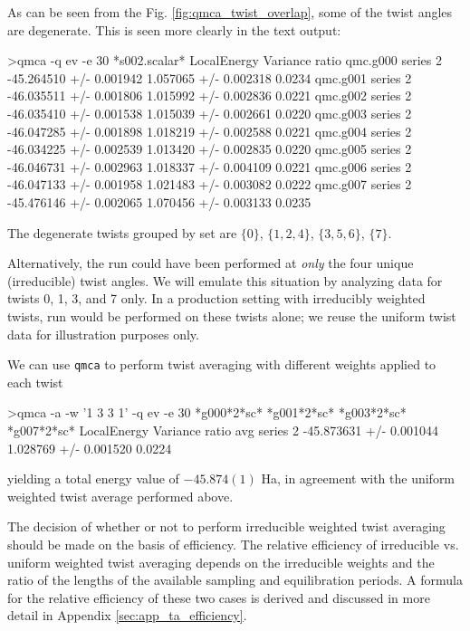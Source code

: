 As can be seen from the Fig. \ref{fig:qmca_twist_overlap}, some of the twist 
angles are degenerate. This is seen more clearly in the text output:
\begin{shade}
>qmca -q ev -e 30 *s002.scalar*
                            LocalEnergy               Variance           ratio 
qmc.g000  series 2  -45.264510 +/- 0.001942   1.057065 +/- 0.002318   0.0234 
qmc.g001  series 2  -46.035511 +/- 0.001806   1.015992 +/- 0.002836   0.0221 
qmc.g002  series 2  -46.035410 +/- 0.001538   1.015039 +/- 0.002661   0.0220 
qmc.g003  series 2  -46.047285 +/- 0.001898   1.018219 +/- 0.002588   0.0221 
qmc.g004  series 2  -46.034225 +/- 0.002539   1.013420 +/- 0.002835   0.0220 
qmc.g005  series 2  -46.046731 +/- 0.002963   1.018337 +/- 0.004109   0.0221 
qmc.g006  series 2  -46.047133 +/- 0.001958   1.021483 +/- 0.003082   0.0222 
qmc.g007  series 2  -45.476146 +/- 0.002065   1.070456 +/- 0.003133   0.0235 
\end{shade}
\noindent
The degenerate twists grouped by set are $\{0\}$, $\{1,2,4\}$, $\{3,5,6\}$, 
$\{7\}$.

Alternatively, the run could have been performed at \emph{only} the four 
unique (irreducible) twist angles.  We will emulate this situation by 
analyzing data for twists 0, 1, 3, and 7 only.  In a production setting 
with irreducibly weighted twists, run would be performed on these twists 
alone; we reuse the uniform twist data for illustration purposes only.  

We can use \texttt{qmca} to perform twist averaging with different 
weights applied to each twist
\begin{shade}
>qmca -a -w '1 3 3 1' -q ev -e 30 *g000*2*sc* *g001*2*sc* *g003*2*sc* *g007*2*sc*
                            LocalEnergy               Variance           ratio 
avg  series 2  -45.873631 +/- 0.001044   1.028769 +/- 0.001520   0.0224 
\end{shade}
\noindent
yielding a total energy value of $-45.874(1)$ Ha, in agreement with the 
uniform weighted twist average performed above.  

The decision of whether or not to perform irreducible weighted twist 
averaging should be made on the basis of efficiency.  The relative 
efficiency of irreducible vs. uniform weighted twist averaging 
depends on the irreducible weights and the ratio of the lengths of 
the available sampling and equilibration periods.  A formula for 
the relative efficiency of these two cases is derived and discussed 
in more detail in Appendix \ref{sec:app_ta_efficiency}.


